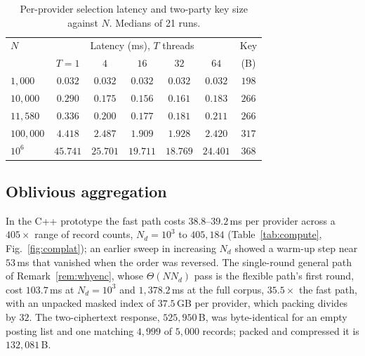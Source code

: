 \documentclass[a4paper,fleqn]{cas-sc}
\newif\ifauthorchecks
\newcommand{\authorcheck}[1]{\ifauthorchecks{\color{red}\textsf{[Authors: #1]}}\fi}
\begin{document}
\begin{table}[pos=htbp]
\caption{Per-provider selection latency and two-party key size against $N$.
Medians of 21 runs.}
\label{tab:search}
\centering
\footnotesize
\setlength{\tabcolsep}{2pt}
\renewcommand{\arraystretch}{1.2}
\begin{tabular*}{\tblwidth}{@{\extracolsep{\fill}}lcccccc@{}}
\toprule
$N$ & \multicolumn{5}{c}{Latency (ms), $T$ threads} & Key \\
\cmidrule(lr){2-6}
    & $T=1$ & $4$ & $16$ & $32$ & $64$ & (B) \\
\midrule
$1{,}000$    & $0.032$  & $0.032$  & $0.032$  & $0.032$  & $0.032$  & $198$ \\
$10{,}000$   & $0.290$  & $0.175$  & $0.156$  & $0.161$  & $0.183$  & $266$ \\
$11{,}580$   & $0.336$  & $0.200$  & $0.177$  & $0.181$  & $0.211$  & $266$ \\
$100{,}000$  & $4.418$  & $2.487$  & $1.909$  & $1.928$  & $2.420$  & $317$ \\
$10^{6}$     & $45.741$ & $25.701$ & $19.711$ & $18.769$ & $24.401$ & $368$ \\
\bottomrule
\end{tabular*}
\end{table}

\subsection{Oblivious aggregation}
\label{sec:aggresult}
In the C++ prototype the fast path costs $38.8$--$39.2$\,ms per provider across
a $405\times$ range of record counts, $N_d=10^3$ to $405{,}184$
(Table~\ref{tab:compute}, Fig.~\ref{fig:complat}); an earlier sweep in
increasing $N_d$ showed a warm-up step near $53$\,ms that vanished when the
order was reversed. The single-round general path of Remark~\ref{rem:whyenc},
whose $\Theta(NN_d)$ pass is the flexible path's first round, cost $103.7$\,ms
at $N_d=10^3$ and $1{,}378.2$\,ms at the full corpus, $35.5\times$ the fast
path, with an unpacked masked index of $37.5$\,GB per provider, which packing
divides by $32$. \authorcheck{Re-measure this column in C++ as flexible round
one plus round two, with the packed index.} The two-ciphertext response,
$525{,}950$\,B, was byte-identical for an empty posting list and one matching
$4{,}999$ of $5{,}000$ records; packed and compressed it is $132{,}081$\,B.
\end{document}
